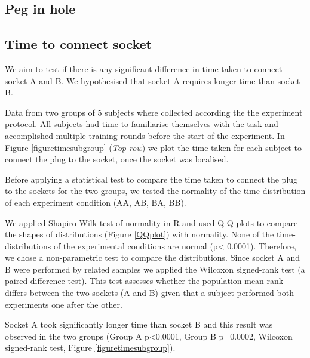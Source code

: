 
\begin{appendices}

\chapter{Peg in hole}

\section{Time to connect socket}
\label{app:anova_socket}


We aim to test if there is any significant difference in time taken to connect socket A and B. We hypothesised that socket A requires longer time than socket B. 


Data from two groups of 5 subjects where collected according the the experiment protocol.
All subjects had time to familiarise themselves with the task and accomplished multiple training rounds 
before the start of the experiment.
In Figure \ref{figuretimesubgroup} (\textit{Top row}) we plot the time taken for each subject to connect the plug 
to the socket, once the socket was localised.
 
Before applying a statistical test to compare the time taken to connect the plug to the sockets for the 
two groups, we tested the normality of the time-distribution of each experiment condition (AA, AB, BA, BB).

We applied Shapiro-Wilk test of normality in R and used Q-Q plots to compare the shapes 
of distributions (Figure \ref{QQplot}) with normality. None of the time-distributions of the experimental conditions
are normal (p< 0.0001). Therefore, we chose a non-parametric test to compare the 
distributions. Since socket A and B were performed by related samples we applied the
Wilcoxon signed-rank test (a paired difference test). This test assesses whether the population mean rank differs 
between the two sockets (A and B) given that a subject performed both experiments one after the other.

Socket A took significantly longer time than socket B and this result was observed in the two 
groups (Group A p<0.0001, Group B p=0.0002, Wilcoxon signed-rank test, Figure \ref{figuretimesubgroup}).   



\end{appendices}
